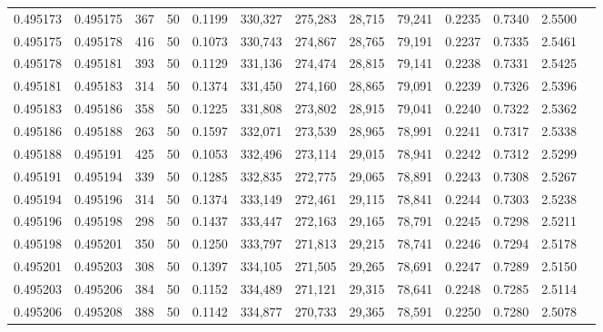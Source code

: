 \begin{tabular}{rrrrrrrrrrrrr}
0.495173 & 0.495175 &   367 &  50 &                                     0.1199 & 330,327 & 275,283 &  28,715 &  79,241 & 0.2235 & 0.7340 & 2.5500 \\
0.495175 & 0.495178 &   416 &  50 &                                     0.1073 & 330,743 & 274,867 &  28,765 &  79,191 & 0.2237 & 0.7335 & 2.5461 \\
0.495178 & 0.495181 &   393 &  50 &                                     0.1129 & 331,136 & 274,474 &  28,815 &  79,141 & 0.2238 & 0.7331 & 2.5425 \\
0.495181 & 0.495183 &   314 &  50 &                                     0.1374 & 331,450 & 274,160 &  28,865 &  79,091 & 0.2239 & 0.7326 & 2.5396 \\
0.495183 & 0.495186 &   358 &  50 &                                     0.1225 & 331,808 & 273,802 &  28,915 &  79,041 & 0.2240 & 0.7322 & 2.5362 \\
0.495186 & 0.495188 &   263 &  50 &                                     0.1597 & 332,071 & 273,539 &  28,965 &  78,991 & 0.2241 & 0.7317 & 2.5338 \\
0.495188 & 0.495191 &   425 &  50 &                                     0.1053 & 332,496 & 273,114 &  29,015 &  78,941 & 0.2242 & 0.7312 & 2.5299 \\
0.495191 & 0.495194 &   339 &  50 &                                     0.1285 & 332,835 & 272,775 &  29,065 &  78,891 & 0.2243 & 0.7308 & 2.5267 \\
0.495194 & 0.495196 &   314 &  50 &                                     0.1374 & 333,149 & 272,461 &  29,115 &  78,841 & 0.2244 & 0.7303 & 2.5238 \\
0.495196 & 0.495198 &   298 &  50 &                                     0.1437 & 333,447 & 272,163 &  29,165 &  78,791 & 0.2245 & 0.7298 & 2.5211 \\
0.495198 & 0.495201 &   350 &  50 &                                     0.1250 & 333,797 & 271,813 &  29,215 &  78,741 & 0.2246 & 0.7294 & 2.5178 \\
0.495201 & 0.495203 &   308 &  50 &                                     0.1397 & 334,105 & 271,505 &  29,265 &  78,691 & 0.2247 & 0.7289 & 2.5150 \\
0.495203 & 0.495206 &   384 &  50 &                                     0.1152 & 334,489 & 271,121 &  29,315 &  78,641 & 0.2248 & 0.7285 & 2.5114 \\
0.495206 & 0.495208 &   388 &  50 &                                     0.1142 & 334,877 & 270,733 &  29,365 &  78,591 & 0.2250 & 0.7280 & 2.5078 \\

\end{tabular}
